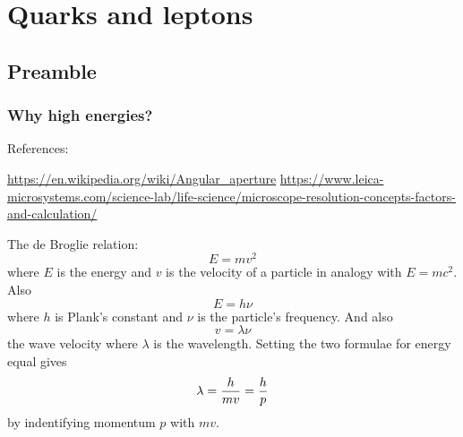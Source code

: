 \documentclass{book}
\begin{document}
\chapter{Quarks and leptons}

\section{Preamble}

\subsection{Why high energies?}

References:

\url{https://en.wikipedia.org/wiki/Angular\_aperture}
\url{https://www.leica-microsystems.com/science-lab/life-science/microscope-resolution-concepts-factors-and-calculation/}

The de Broglie relation:
$$
E = mv^2
$$
where $E$ is the energy and $v$ is the velocity of a particle in analogy with $E=mc^2$. Also
$$
E = h\nu
$$
where $h$ is Plank's constant and $\nu$ is the particle's frequency. And also
$$
v = \lambda\nu
$$
the wave velocity where $\lambda$ is the wavelength. Setting the two formulae for energy equal gives
$$
\lambda = {h \over mv} = {h \over p}
$$
by indentifying momentum $p$ with $mv$.
\end{document}
